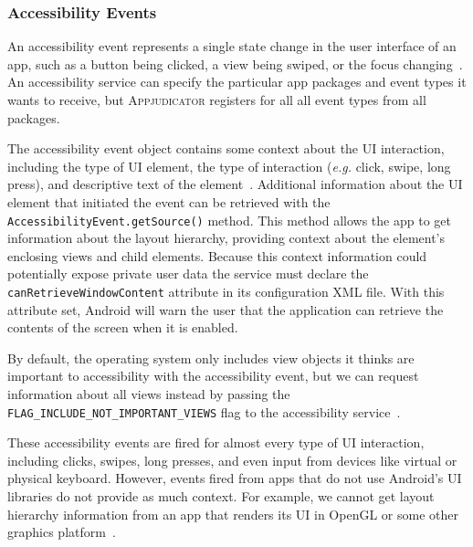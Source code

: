 
\subsubsection{Accessibility Events}
\label{sec:accessibility-events}

An accessibility event represents a single state change in the user interface of
an app, such as a button being clicked, a view being swiped, or the focus
changing~\cite{accessibilityserviceguide}. An accessibility service can specify
the particular app packages and event types it wants to receive, but
\textsc{Appjudicator} registers for all all event types from all packages.

The accessibility event object contains some context about the UI interaction,
including the type of UI element, the type of interaction (\textit{e.g.} click,
swipe, long press), and descriptive text of the
element~\cite{accessibilityserviceguide}. Additional information about the UI
element that initiated the event can be retrieved with the
\texttt{AccessibilityEvent.getSource()} method. This method allows the app to
get information about the layout hierarchy, providing context about the
element's enclosing views and child elements. Because this context information
could potentially expose private user data the service must declare the
\texttt{canRetrieveWindowContent} attribute in its configuration XML file. With
this attribute set, Android will warn the user that the application can retrieve
the contents of the screen when it is enabled.

By default, the operating system only includes view objects it thinks are
important to accessibility with the accessibility event, but we can request
information about all views instead by passing the 
\texttt{FLAG\_INCLUDE\_NOT\_IMPORTANT\_VIEWS} flag to the accessibility
service~\cite{accessibilityserviceguide}.

These accessibility events are fired for almost every type of UI interaction,
including clicks, swipes, long presses, and even input from devices like virtual
or physical keyboard. However, events fired from apps that do not use Android's
UI libraries do not provide as much context. For example, we cannot get layout
hierarchy information from an app that renders its UI in OpenGL or some other
graphics platform~\cite{accessibilityserviceguide}.

